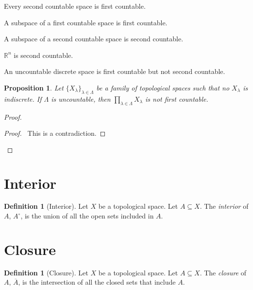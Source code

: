 \documentclass{book}
\let\qed\relax
\newtheorem{prop}[ax]{Proposition}
\theoremstyle{definition}
\newtheorem{df}[ax]{Definition}
\begin{document}
Every second countable space is first countable.

A subspace of a first countable space is first countable.

A subspace of a second countable space is second countable.

$\mathbb{R}^n$ is second countable.

An uncountable discrete space is first countable but not second countable.

\begin{prop}
Let $\{ X_\lambda \}_{\lambda \in \Lambda}$ be a family of topological spaces such that no $X_\lambda$ is indiscrete. If $\Lambda$ is uncountable, then $\prod_{\lambda \in \Lambda} X_\lambda$ is not first countable.
\end{prop}

\begin{proof}
\pf
{}
\qedstep
\begin{proof}
\pf\ This is a contradiction.
\end{proof}
\qed
\end{proof}

\section{Interior}

\begin{df}[Interior]
Let $X$ be a topological space. Let $A \subseteq X$. The \emph{interior} of $A$, $A^\circ$, is the union of all the open sets included in $A$.
\end{df}

\section{Closure}

\begin{df}[Closure]
Let $X$ be a topological space. Let $A \subseteq X$. The \emph{closure} of $A$, $\overline{A}$, is the intersection of all the closed sets that include $A$.
\end{df}
\end{document}
